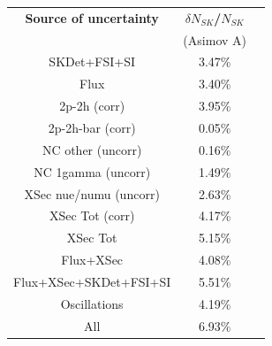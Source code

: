 





\begin{table}[htb]
\centering
\begin{tabular}{| c | c | c |}
\hline
  {\bf Source of uncertainty}    & \multicolumn{1}{c|}{{\bf ${\delta}N_{SK}$/$N_{SK}$}}\\
                                 & \multicolumn{1}{c|}{(Asimov A)}\\

\hline
\hline  SKDet+FSI+SI                   & 3.47\%                        \\
\hline
  Flux                           & 3.40\%                        \\
\hline
\hline
  2p-2h (corr)                     & 3.95\%                        \\
  2p-2h-bar (corr)                  & 0.05\%                        \\
  NC other (uncorr)              & 0.16\%                        \\
  NC 1gamma (uncorr)             & 1.49\%                        \\
  XSec nue/numu (uncorr)                 & 2.63\%                        \\
\hline
  XSec Tot (corr)                  & 4.17\%                        \\
  XSec Tot                       & 5.15\%                        \\
\hline
\hline
  Flux+XSec                      & 4.08\%                        \\
\hline
  Flux+XSec+SKDet+FSI+SI         & 5.51\%                        \\
\hline
\hline
  Oscillations                   & 4.19\%                        \\
\hline
\hline
  All                            & 6.93\%                        \\
\hline
\hline


\end{tabular}
\end{table}
